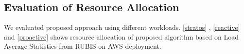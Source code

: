 \subsection{Evaluation of Resource Allocation}
We evaluated proposed approach using different workloads. \ref{stratos} , \ref{reactive} and \ref{proactive} shows resource allocation of proposed algorithm based on Load Average Statistics from RUBIS on AWS deployment.
